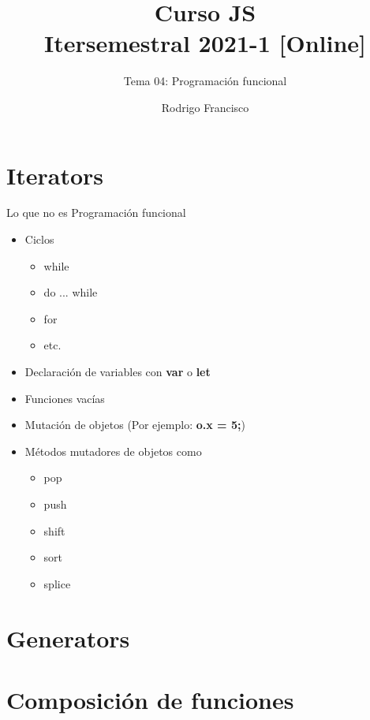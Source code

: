 \documentclass[aspectratio=169]{beamer}
\title{Curso JS \\ Itersemestral 2021-1 [Online]} %
\subtitle{Tema 04: Programación funcional} %
\author{
  Rodrigo Francisco \\
}
\begin{document}
  \shorthandoff{-}
  \frame[c]{\maketitle}


  \begin{darkframes}
    \section{Iterators}
    \begin{frame}{Lo que no es Programación funcional}
      \begin{itemize}
        \item Ciclos
        \begin{itemize}
          \item while
          \item do ... while
          \item for
          \item etc.
        \end{itemize}
        \item Declaración de variables con \textbf{var} o \textbf{let}
        \item Funciones vacías
        \item Mutación de objetos (Por ejemplo: \textbf{o.x = 5;})
        \item Métodos mutadores de objetos como
        \begin{itemize}
          \item pop
          \item push
          \item shift
          \item sort
          \item splice
        \end{itemize}
      \end{itemize}
    \end{frame}
    \section{Generators}
    \section{Composición de funciones}
   
  \end{darkframes}
\end{document}
